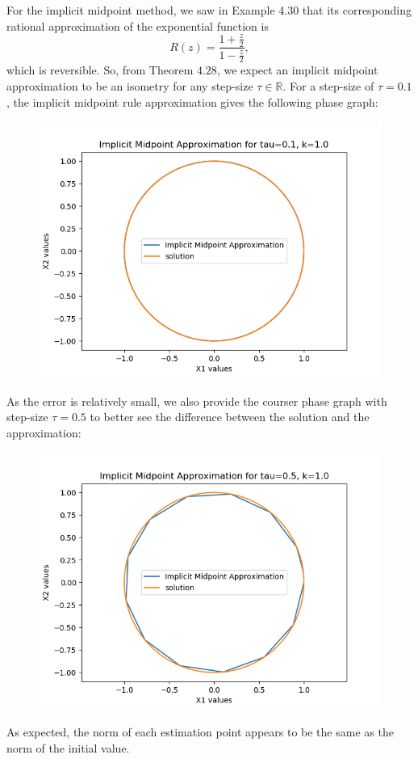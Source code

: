 \documentclass{article}
\theoremstyle{definition}
\begin{document}
\begin{itemize}
		For the implicit midpoint method, we saw in Example 4.30 that
		its corresponding
		rational approximation of the exponential function is
		\[
			R(z) = \frac{1+\frac{z}{2}}{1-\frac{z}{2}},
		\]
		which is reversible.  So, from Theorem $4.28$, we expect an
		implicit midpoint approximation to be an isometry for any
		step-size $\tau \in \mathbb{R}$. For a step-size of $\tau=0.1$,
		the implicit midpoint rule approximation gives the following
		phase graph:
		\begin{figure}[H]
			\includegraphics[scale=0.6]{harmonic_phase_mid_01}
		\end{figure}
		As the error is relatively small, we also provide the
		courser phase graph with step-size $\tau=0.5$ to better see the
		difference between the solution and the approximation:
		\begin{figure}[H]
			\includegraphics[scale=0.6]{harmonic_phase_mid_05}
		\end{figure}
		As expected, the norm of each estimation point appears to be the
		same as the norm of the initial value.


\end{itemize}
\end{document}
